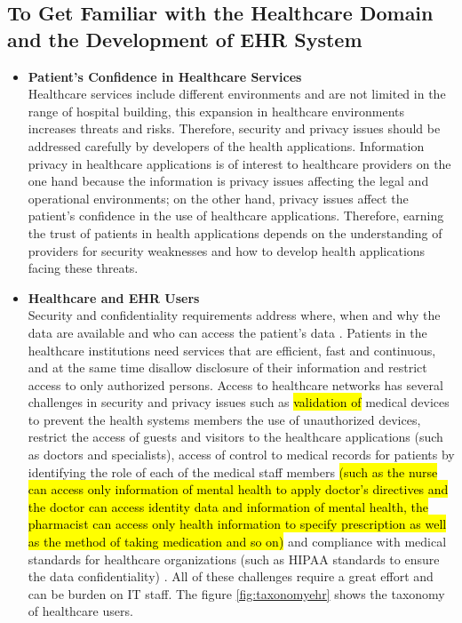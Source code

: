 \documentclass[a4paper,11pt]{article}
\DeclareRobustCommand{\hlyellow}[1]{{\sethlcolor{white}\hl{#1}}}
\begin{document}
\subsection{To Get Familiar with the Healthcare Domain and the Development of EHR System}
\begin{itemize}
\item \textbf{Patient's Confidence in Healthcare Services}\\
Healthcare services include different environments and are not limited in the range of hospital building, this expansion in healthcare environments increases threats and risks. Therefore, security and privacy issues should be addressed carefully by developers of the health applications. Information privacy in healthcare applications is of interest to healthcare providers on the one hand because the information is privacy issues affecting the legal and operational environments; on the other hand, privacy issues affect the patient's confidence in the use of healthcare applications. Therefore, earning the trust of patients in health applications depends on the understanding of providers for security weaknesses and how to develop health applications facing these threats. 

\item \textbf{Healthcare and EHR Users}\\
Security and confidentiality requirements address where, when and why the data are available and who can access the patient's data \cite{pr44}. Patients in the healthcare institutions need services that are efficient, fast and continuous, and at the same time disallow disclosure of their information and restrict access to only authorized persons. Access to healthcare networks has several challenges in security and privacy issues such as \hlyellow{validation of} medical devices to prevent the health systems members the use of unauthorized devices, restrict the access of guests and visitors to the healthcare applications (such as doctors and specialists), access of control to medical records for patients by identifying the role of each of the medical staff members \hlyellow{(such as the nurse can access only information of mental health to apply doctor's directives and the doctor can access identity data and information of mental health, the pharmacist can access only health information to specify prescription as well as the method of taking medication and so on)} and compliance with medical standards for healthcare organizations (such as HIPAA standards to ensure the data confidentiality) \cite{pr45}. All of these challenges require a great effort and can be burden on IT staff. The figure \ref {fig:taxonomyehr} shows the taxonomy of healthcare users.


\end{itemize}
\end{document}
